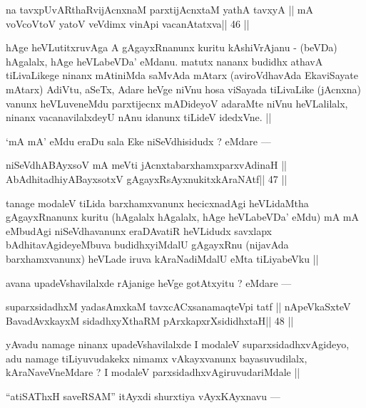 \begin{shl}
na tavxpUvARthaRvijAcnxnaM parxtijAcnxtaM yathA tavxyA ||
mA voVcoV\s toV yatoV veVdimx vinA\s pi vacanAtatxva\hfill || 46 ||
\end{shl}

\begin{artha}
hAge heVLutitxruvAga A gAgayxRnanunx kuritu kAshiVrAjanu - (beVDa) 
hAgalalx, hAge heVLabeVDa' eMdanu. matutx nananx budidhx athavA 
tiLivaLikege ninanx mAtiniMda saMvAda mAtarx (aviroVdhavAda EkaviSayate mAtarx) AdiVtu, aSeTx, Adare heVge niVnu hosa viSayada tiLivaLike (jAcnxna) vanunx heVLuveneMdu parxtijecnx mADideyoV adaraMte niVnu heVLalilalx, ninanx vacanavilalxdeyU nAnu idanunx tiLideV idedxVne. ||
\end{artha}

\begin{artha}
`mA mA' eMdu eraDu sala Eke niSeVdhisidudx ? eMdare ---
\end{artha}

\begin{shl}
niSeVdhABAyxsoV mA meVti jAcnxtabarxhamxparxvAdinaH ||
AbAdhitadhiyA\s BayxsotxV gAgayxRsAyxnukitxkAraNAtf\hfill || 47 ||
\end{shl}

\begin{artha}
tanage modaleV  tiLida barxhamxvanunx hecicxnadAgi heVLidaMtha 
gAgayxRnanunx kuritu (hAgalalx hAgalalx, hAge heVLabeVDa' eMdu) mA mA eMbudAgi niSeVdhavanunx eraDAvatiR heVLidudx savxlapx bAdhitavAgideyeMbuva budidhxyiMdalU gAgayxRnu (nijavAda barxhamxvanunx) heVLade iruva kAraNadiMdalU eMta tiLiyabeVku ||
\end{artha}

\begin{artha}
avana upadeVshavilalxde rAjanige heVge gotAtxyitu ? eMdare ---
\end{artha}

\begin{shl}
suparxsidadhxM yadasAmxkaM tavxcACxsanamaqteV\s pi tatf ||
nApeVkaSxteV BavadAvxkayxM sidadhxyXthaRM pArxkapxrXsididhxtaH\hfill || 48 ||
\end{shl}

\begin{artha}
yAvadu namage ninanx upadeVshavilalxde I modaleV suparxsidadhxvAgideyo, 
adu namage tiLiyuvudakekx nimamx vAkayxvanunx bayasuvudilalx, kAraNaveVneMdare ? I modaleV parxsidadhxvAgiruvudariMdale ||
\end{artha}

\begin{artha}
``atiSAThxH saveRSAM'' itAyxdi shurxtiya vAyxKAyxnavu ---
\end{artha}

